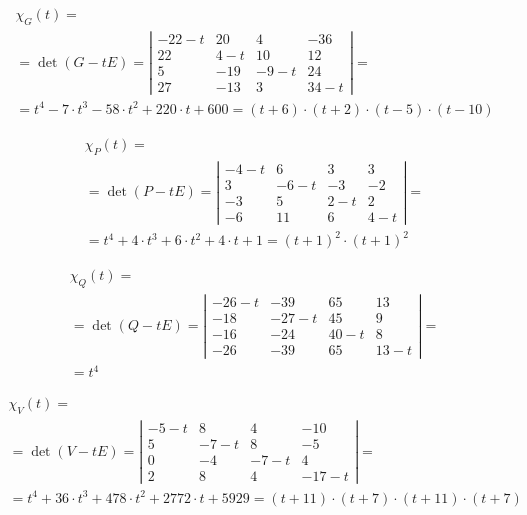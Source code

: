 \documentclass[12pt, a4paper]{article}
\begin{document}
    \begin{multline}
        \chi_G(t) = \\
        = \det (G-tE) = \left|\begin{matrix}
            -22-t & 20 & 4 & -36 \\
            22 & 4-t & 10 & 12 \\
            5 & -19 & -9-t & 24 \\
            27 & -13 & 3 & 34-t
        \end{matrix}\right| = \\
        = t^4-7 \cdot t^3-58 \cdot t^2+220 \cdot t+600 = (t+6) \cdot (t+2) \cdot (t-5) \cdot (t-10)
    \end{multline}

    \begin{multline}
        \chi_P(t) = \\
        = \det (P-tE) = \left|\begin{matrix}
            -4-t & 6 & 3 & 3 \\
            3 & -6-t & -3 & -2 \\
            -3 & 5 & 2-t & 2 \\
            -6 & 11 & 6 & 4-t
        \end{matrix}\right| = \\
        = t^4+4 \cdot t^3+6 \cdot t^2+4 \cdot t+1 = (t+1)^2 \cdot (t+1)^2
    \end{multline}

    \begin{multline}
        \chi_Q(t) = \\
        = \det (Q-tE) = \left|\begin{matrix}
            -26-t & -39 & 65 & 13 \\
            -18 & -27-t & 45 & 9 \\
            -16 & -24 & 40-t & 8 \\
            -26 & -39 & 65 & 13-t
        \end{matrix}\right| = \\
        = t^4
    \end{multline}

    \begin{multline}
        \chi_V(t) = \\
        = \det (V-tE) = \left|\begin{matrix}
            -5-t & 8 & 4 & -10 \\
            5 & -7-t & 8 & -5 \\
            0 & -4 & -7-t & 4 \\
            2 & 8 & 4 & -17-t
        \end{matrix}\right| = \\
        = t^4+36 \cdot t^3+478 \cdot t^2+2772 \cdot t+5929=(t+11) \cdot (t+7) \cdot (t+11) \cdot (t+7)
    \end{multline}
\end{document}
